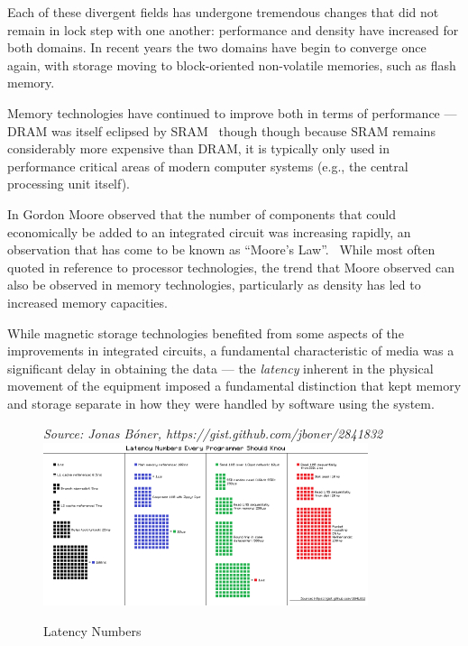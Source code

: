 Each of these divergent fields has undergone tremendous changes that did not remain
in lock step with one another: performance and density have increased for both
domains.  In recent years the two domains have begin to converge once again, with
storage moving to block-oriented non-volatile memories, such as flash 
memory.~\cite{bez2003introduction}

Memory technologies have continued to improve both in terms of performance --- \acs{DRAM}
was itself eclipsed by \acs{SRAM}~\cite{US4322675A} though though because \acs{SRAM} 
remains considerably more expensive than \acs{DRAM}, it is typically only used in performance
critical areas of modern computer systems (e.g., the central processing unit itself).

In \citeyear{moore1965cramming} Gordon Moore observed that the number of components that
could economically be added to an integrated circuit was increasing rapidly, an observation
that has come to be known as ``Moore's Law''.~\cite{moore1965cramming}  While most often quoted
in reference to processor technologies, the trend that Moore observed can also be observed
in memory technologies, particularly as density has led to increased memory capacities.

While magnetic storage technologies benefited from some aspects of the improvements in
integrated circuits, a fundamental characteristic of media was a significant delay in obtaining
the data --- the \textit{latency} inherent in the physical movement of the equipment imposed
a fundamental distinction that kept memory and storage separate in how they were handled by
software using the system.

\begin{figure}
    \centering
    \caption{Latency Numbers}\label{figure:jeff-dean-numbers}
    \emph{Source: Jonas B\'oner, https://gist.github.com/jboner/2841832}
    \includegraphics[width=0.85\textwidth]{figures/jeff-dean-numbers.png}
\end{figure}
    
